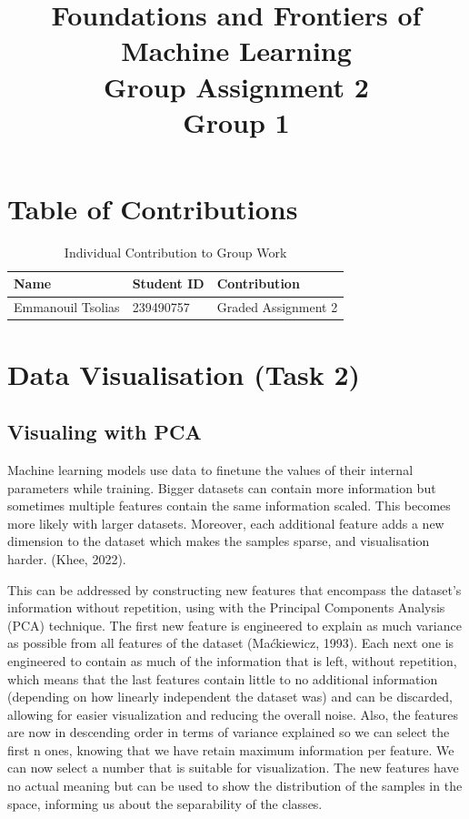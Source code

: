 \documentclass{article}
\begin{document}
\title{Foundations and Frontiers of Machine Learning\\Group Assignment 2\\Group 1}
\author{}
\date{}
\maketitle

\tableofcontents
\newpage

\listoffigures
\listoftables
\newpage

\section{Table of Contributions}

\begin{table}[h!]
    \centering
    \begin{tabular}{|l|l|l|}
        \hline
        \textbf{Name} & \textbf{Student ID} & \textbf{Contribution} \\ \hline
        Emmanouil Tsolias       & 239490757 & Graded Assignment 2 \\ \hline
    \end{tabular}
    \caption{Individual Contribution to Group Work}
    \label{tab:contributions}
\end{table}
\newpage

\section{Data Visualisation (Task 2)}
\subsection{Visualing with PCA}

Machine learning models use data to finetune the values of their internal parameters while training.
Bigger datasets can contain more information but sometimes multiple features contain the same information scaled.
This becomes more likely with larger datasets.
Moreover, each additional feature adds a new dimension to the dataset which makes the samples sparse, and visualisation harder. (Khee, 2022).

This can be addressed by constructing new features that encompass the dataset’s information without repetition, using with the Principal Components Analysis (PCA) technique.
The first new feature is engineered to explain as much variance as possible from all features of the dataset (Maćkiewicz, 1993).
Each next one is engineered to contain as much of the information that is left, without repetition, which means that the last features contain little to no additional information (depending on how linearly independent the dataset was) and can be discarded, allowing for easier visualization and reducing the overall noise.
Also, the features are now in descending order in terms of variance explained so we can select the first n ones, knowing that we have retain maximum information per feature.
We can now select a number that is suitable for visualization.
The new features have no actual meaning but can be used to show the distribution of the samples in the space, informing us about the separability of the classes.
\end{document}
